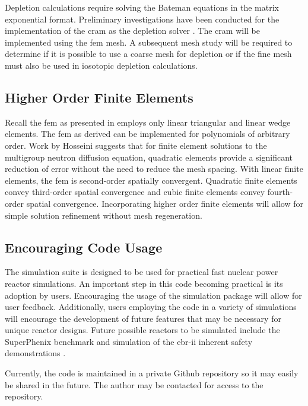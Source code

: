     Depletion calculations require solving the Bateman equations in the matrix
    exponential format. Preliminary investigations have been conducted for the
    implementation of the \gls{cram} as the depletion solver \cite{cram}. The 
    \gls{cram} will be implemented using the \gls{fem} mesh. A subsequent mesh 
    study will be required to determine if it is possible to use a coarse mesh 
    for depletion or if the fine mesh must also be used in iosotopic depletion 
    calculations.

  \subsection{Higher Order Finite Elements}
    Recall the \gls{fem} as presented in  employs
    only linear triangular and linear wedge elements. The \gls{fem} as derived 
    can be implemented for polynomials of arbitrary order. Work by Hosseini
    \cite{Hosseini2013} suggests that for finite element solutions to the
    multigroup neutron diffusion equation, quadratic elements provide a 
    significant reduction of error without the need to reduce the mesh spacing. 
    With linear finite elements, the \gls{fem} is second-order spatially 
    convergent. Quadratic finite elements convey third-order spatial convergence 
    and cubic finite elements convey fourth-order spatial convergence. 
    Incorporating higher order finite elements will allow for simple solution 
    refinement without mesh regeneration.

  \subsection{Encouraging Code Usage}
    The simulation suite is designed to be used for practical fast nuclear power
    reactor simulations. An important step in this code becoming practical is 
    its adoption by users. Encouraging the usage of the simulation package will
    allow for user feedback. Additionally, users employing the code in a variety
    of simulations will encourage the development of future features that may be
    necessary for unique reactor designs. Future possible reactors to be 
    simulated include the SuperPhenix benchmark and simulation of the
    \gls{ebr-ii} inherent safety demonstrations \cite{ebriitests}.
    
    \renewcommand{\thefootnote}{\fnsymbol{footnote}}
    Currently, the code is maintained in a private Github repository so it may 
    easily be shared in the future. The author may be contacted\footnotemark 
    for access to the repository. 



\glsresetall
